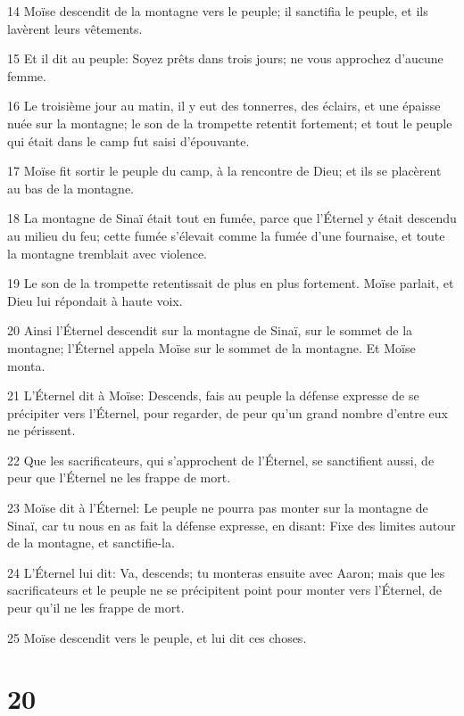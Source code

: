 \par 14 Moïse descendit de la montagne vers le peuple; il sanctifia le peuple, et ils lavèrent leurs vêtements.
\par 15 Et il dit au peuple: Soyez prêts dans trois jours; ne vous approchez d'aucune femme.
\par 16 Le troisième jour au matin, il y eut des tonnerres, des éclairs, et une épaisse nuée sur la montagne; le son de la trompette retentit fortement; et tout le peuple qui était dans le camp fut saisi d'épouvante.
\par 17 Moïse fit sortir le peuple du camp, à la rencontre de Dieu; et ils se placèrent au bas de la montagne.
\par 18 La montagne de Sinaï était tout en fumée, parce que l'Éternel y était descendu au milieu du feu; cette fumée s'élevait comme la fumée d'une fournaise, et toute la montagne tremblait avec violence.
\par 19 Le son de la trompette retentissait de plus en plus fortement. Moïse parlait, et Dieu lui répondait à haute voix.
\par 20 Ainsi l'Éternel descendit sur la montagne de Sinaï, sur le sommet de la montagne; l'Éternel appela Moïse sur le sommet de la montagne. Et Moïse monta.
\par 21 L'Éternel dit à Moïse: Descends, fais au peuple la défense expresse de se précipiter vers l'Éternel, pour regarder, de peur qu'un grand nombre d'entre eux ne périssent.
\par 22 Que les sacrificateurs, qui s'approchent de l'Éternel, se sanctifient aussi, de peur que l'Éternel ne les frappe de mort.
\par 23 Moïse dit à l'Éternel: Le peuple ne pourra pas monter sur la montagne de Sinaï, car tu nous en as fait la défense expresse, en disant: Fixe des limites autour de la montagne, et sanctifie-la.
\par 24 L'Éternel lui dit: Va, descends; tu monteras ensuite avec Aaron; mais que les sacrificateurs et le peuple ne se précipitent point pour monter vers l'Éternel, de peur qu'il ne les frappe de mort.
\par 25 Moïse descendit vers le peuple, et lui dit ces choses.

\chapter{20}

